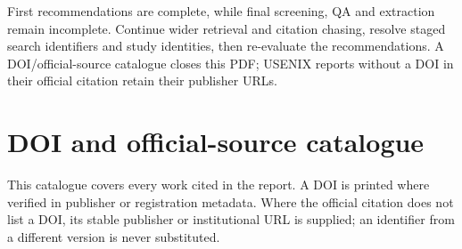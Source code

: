 \documentclass[12pt,a4paper]{article}
\begin{document}
First recommendations are complete, while final screening, QA and extraction remain incomplete. Continue wider retrieval and citation chasing, resolve staged search identifiers and study identities, then re-evaluate the recommendations. A DOI/\allowbreak{}official-source catalogue closes this PDF; USENIX reports without a DOI in their official citation retain their publisher URLs.


\clearpage
\clearpage\section{DOI and official-source catalogue}
This catalogue covers every work cited in the report. A DOI is printed where verified in publisher or registration metadata. Where the official citation does not list a DOI, its stable publisher or institutional URL is supplied; an identifier from a different version is never substituted.
\end{document}
